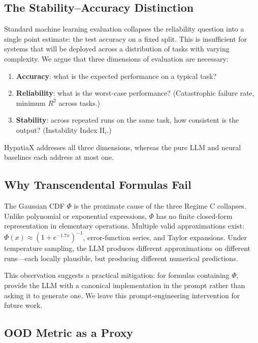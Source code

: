 \documentclass[twoside,11pt]{article}
\newcommand{\Rsq}{R^{2}}
\newcommand{\II}{\mathrm{II}}
\begin{document}
\subsection{The Stability--Accuracy Distinction}
\label{sec:disc_stability}

Standard machine learning evaluation collapses the reliability question into a
single point estimate: the test accuracy on a fixed split.  This is insufficient
for systems that will be deployed across a distribution of tasks with varying
complexity.  We argue that three dimensions of evaluation are necessary:
\begin{enumerate}[leftmargin=2em,label=(\roman*)]
  \item \textbf{Accuracy}: what is the expected performance on a typical task?
  \item \textbf{Reliability}: what is the worst-case performance?
    (Catastrophic failure rate, minimum $\Rsq$ across tasks.)
  \item \textbf{Stability}: across repeated runs on the same task, how consistent
    is the output?  (Instability Index $\II_i$.)
\end{enumerate}

HypatiaX addresses all three dimensions, whereas the pure LLM and neural baselines
each address at most one.

\subsection{Why Transcendental Formulas Fail}
\label{sec:disc_transcendental}

The Gaussian CDF $\Phi$ is the proximate cause of the three Regime C collapses.
Unlike polynomial or exponential expressions, $\Phi$ has no finite closed-form
representation in elementary operations.  Multiple valid approximations exist:
$\Phi(x) \approx (1 + e^{-1.7x})^{-1}$, error-function series, and Taylor
expansions.  Under temperature sampling, the LLM produces different approximations
on different runs---each locally plausible, but producing different numerical
predictions.

This observation suggests a practical mitigation: for formulas containing $\Phi$,
provide the LLM with a canonical implementation in the prompt rather than asking it
to generate one.  We leave this prompt-engineering intervention for future work.

\subsection{OOD Metric as a Proxy}
\label{sec:ood_proxy}
\end{document}
